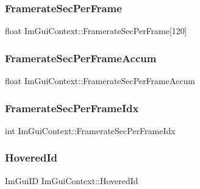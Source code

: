 \subsubsection{\texorpdfstring{Framerate\+Sec\+Per\+Frame}{FramerateSecPerFrame}}
{\footnotesize\ttfamily float Im\+Gui\+Context\+::\+Framerate\+Sec\+Per\+Frame\mbox{[}120\mbox{]}}

\hypertarget{struct_im_gui_context_abcd18f2f8fedf0f45c3148b3e956e653}{}\label{struct_im_gui_context_abcd18f2f8fedf0f45c3148b3e956e653} 
\subsubsection{\texorpdfstring{Framerate\+Sec\+Per\+Frame\+Accum}{FramerateSecPerFrameAccum}}
{\footnotesize\ttfamily float Im\+Gui\+Context\+::\+Framerate\+Sec\+Per\+Frame\+Accum}

\hypertarget{struct_im_gui_context_a64a96ad72dd7009dba134f6214a4936e}{}\label{struct_im_gui_context_a64a96ad72dd7009dba134f6214a4936e} 
\subsubsection{\texorpdfstring{Framerate\+Sec\+Per\+Frame\+Idx}{FramerateSecPerFrameIdx}}
{\footnotesize\ttfamily int Im\+Gui\+Context\+::\+Framerate\+Sec\+Per\+Frame\+Idx}

\hypertarget{struct_im_gui_context_a32bef5a7740179ad8076643b001f15e4}{}\label{struct_im_gui_context_a32bef5a7740179ad8076643b001f15e4} 
\subsubsection{\texorpdfstring{Hovered\+Id}{HoveredId}}
{\footnotesize\ttfamily Im\+Gui\+ID Im\+Gui\+Context\+::\+Hovered\+Id}

\hypertarget{struct_im_gui_context_a171f67ac705994d413a0bccf491aa4e1}{}\label{struct_im_gui_context_a171f67ac705994d413a0bccf491aa4e1} 
